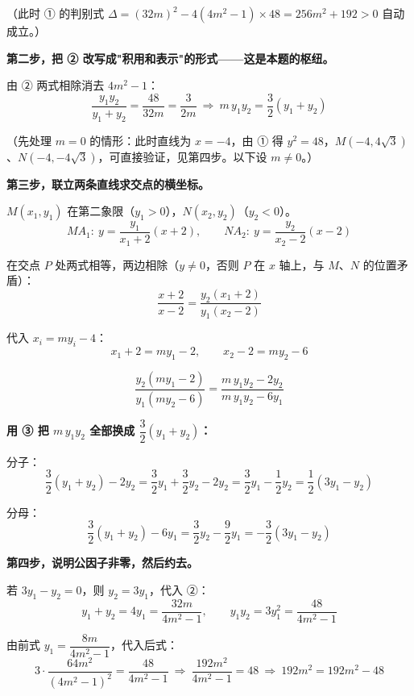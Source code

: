 \begin{answer}
（此时 ① 的判别式 $\Delta=(32m)^{2}-4\left(4m^{2}-1\right)\times48=256m^{2}+192>0$ 自动成立。）

\textbf{第二步，把 ② 改写成"积用和表示"的形式——这是本题的枢纽。}

由 ② 两式相除消去 $4m^{2}-1$：
\nopagebreak[4]
\[\frac{y_1y_2}{y_1+y_2}=\frac{48}{32m}=\frac3{2m}\ \Longrightarrow\ m\,y_1y_2=\frac32\left(y_1+y_2\right)\tag{③}\]

（先处理 $m=0$ 的情形：此时直线为 $x=-4$，由 ① 得 $y^{2}=48$，$M\left(-4,4\sqrt3\right)$、$N\left(-4,-4\sqrt3\right)$，可直接验证，见第四步。以下设 $m\ne0$。）

\textbf{第三步，联立两条直线求交点的横坐标。}

$M\left(x_1,y_1\right)$ 在第二象限（$y_1>0$），$N\left(x_2,y_2\right)$（$y_2<0$）。
\nopagebreak[4]
\[MA_1:\ y=\frac{y_1}{x_1+2}(x+2),\qquad NA_2:\ y=\frac{y_2}{x_2-2}(x-2)\]

在交点 $P$ 处两式相等，两边相除（$y\ne0$，否则 $P$ 在 $x$ 轴上，与 $M$、$N$ 的位置矛盾）：
\nopagebreak[4]
\[\frac{x+2}{x-2}=\frac{y_2\left(x_1+2\right)}{y_1\left(x_2-2\right)}\tag{④}\]

代入 $x_i=my_i-4$：
\nopagebreak[4]
\[x_1+2=my_1-2,\qquad x_2-2=my_2-6\]

\nopagebreak[4]
\[\frac{y_2\left(my_1-2\right)}{y_1\left(my_2-6\right)}=\frac{m\,y_1y_2-2y_2}{m\,y_1y_2-6y_1}\]

\textbf{用 ③ 把 $m\,y_1y_2$ 全部换成 $\dfrac32\left(y_1+y_2\right)$：}

分子：
\nopagebreak[4]
\[\frac32\left(y_1+y_2\right)-2y_2=\frac32y_1+\frac32y_2-2y_2=\frac32y_1-\frac12y_2=\frac12\left(3y_1-y_2\right)\]

分母：
\nopagebreak[4]
\[\frac32\left(y_1+y_2\right)-6y_1=\frac32y_2-\frac92y_1=-\frac32\left(3y_1-y_2\right)\]

\textbf{第四步，说明公因子非零，然后约去。}

若 $3y_1-y_2=0$，则 $y_2=3y_1$，代入 ②：
\nopagebreak[4]
\[y_1+y_2=4y_1=\frac{32m}{4m^{2}-1},\qquad y_1y_2=3y_1^{2}=\frac{48}{4m^{2}-1}\]

由前式 $y_1=\dfrac{8m}{4m^{2}-1}$，代入后式：
\nopagebreak[4]
\[3\cdot\frac{64m^{2}}{\left(4m^{2}-1\right)^{2}}=\frac{48}{4m^{2}-1}\ \Longrightarrow\ \frac{192m^{2}}{4m^{2}-1}=48\ \Longrightarrow\ 192m^{2}=192m^{2}-48\]


\end{answer}
